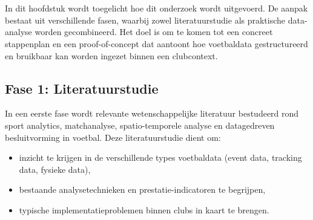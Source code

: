 
\chapter{}%
\label{ch:methodologie}


In dit hoofdstuk wordt toegelicht hoe dit onderzoek wordt uitgevoerd. De aanpak bestaat uit verschillende fasen, waarbij zowel literatuurstudie als praktische data-analyse worden gecombineerd.
Het doel is om te komen tot een concreet stappenplan en een proof-of-concept dat aantoont hoe voetbaldata gestructureerd en bruikbaar kan worden ingezet binnen een clubcontext.

\section{Fase 1: Literatuurstudie}

In een eerste fase wordt relevante wetenschappelijke literatuur bestudeerd rond sport analytics, matchanalyse, spatio-temporele analyse en datagedreven besluitvorming in voetbal.
Deze literatuurstudie dient om:

\begin{itemize}
    \item inzicht te krijgen in de verschillende types voetbaldata (event data, tracking data, fysieke data),
    \item bestaande analysetechnieken en prestatie-indicatoren te begrijpen,
    \item typische implementatieproblemen binnen clubs in kaart te brengen.
\end{itemize}

